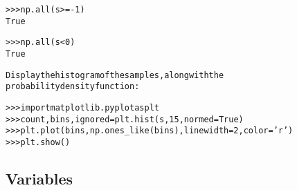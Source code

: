 \begin{boxedminipage}{\funcwidth}
\begin{alltt}
{\textgreater}{\textgreater}{\textgreater} np.all(s {\textgreater}= -1)
True

{\textgreater}{\textgreater}{\textgreater} np.all(s {\textless} 0)
True

Display the histogram of the samples, along with the
probability density function:

{\textgreater}{\textgreater}{\textgreater} import matplotlib.pyplot as plt
{\textgreater}{\textgreater}{\textgreater} count, bins, ignored = plt.hist(s, 15, normed=True)
{\textgreater}{\textgreater}{\textgreater} plt.plot(bins, np.ones\_like(bins), linewidth=2, color='r')
{\textgreater}{\textgreater}{\textgreater} plt.show()
\end{alltt}

\setlength{\parskip}{1ex}
    \end{boxedminipage}



  \subsection{Variables}

